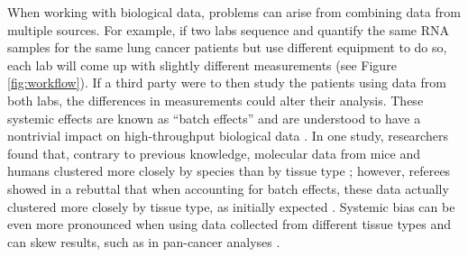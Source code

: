 \documentclass[notitlepage]{article}
\begin{document}
When working with biological data, problems can arise from combining data from multiple sources.
For example, if two labs sequence and quantify the same RNA samples for the same lung cancer patients but use different equipment to do so, each lab will come up with slightly different measurements (see Figure \ref{fig:workflow}).
If a third party were to then study the patients using data from both labs, the differences in measurements could alter their analysis.
These systemic effects are known as ``batch effects'' and are understood to have a nontrivial impact on high-throughput biological data \citep{leek_tackling_2010}.
In one study, researchers found that, contrary to previous knowledge, molecular data from mice and humans clustered more closely by species than by tissue type \citep{yue_comparative_2014};
however, referees showed in a rebuttal that when accounting for batch effects, these data actually clustered more closely by tissue type, as initially expected \citep{gilad_reanalysis_2015}.
Systemic bias can be even more pronounced when using data collected from different tissue types and can skew results, such as in pan-cancer analyses \citep{dayton_classifying_2017-1}.
\end{document}
